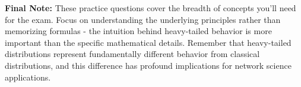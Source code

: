 \documentclass[11pt]{article}
\begin{document}
\textbf{Final Note:} These practice questions cover the breadth of concepts you'll need for the exam. Focus on understanding the underlying principles rather than memorizing formulas - the intuition behind heavy-tailed behavior is more important than the specific mathematical details. Remember that heavy-tailed distributions represent fundamentally different behavior from classical distributions, and this difference has profound implications for network science applications.
\end{document}
